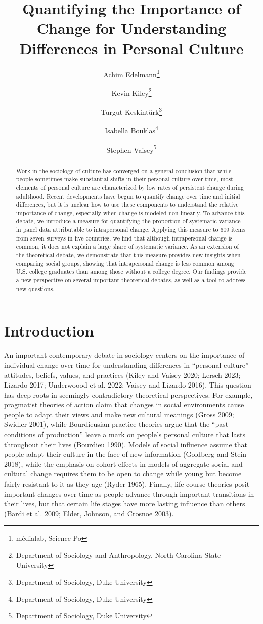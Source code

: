 \documentclass[
  12pt,
]{article}
\title{Quantifying the Importance of Change for Understanding
Differences in Personal Culture}
\author{Achim Edelmann\footnote{médialab, Science Po} \and Kevin
Kiley\footnote{Department of Sociology and Anthropology, North Carolina
  State University} \and Turgut Keskintürk\footnote{Department of
  Sociology, Duke University} \and Isabella
Bouklas\footnote{Department of Sociology, Duke University} \and Stephen
Vaisey\footnote{Department of Sociology, Duke University}}
\date{}
\begin{document}
\maketitle
\begin{abstract}
Work in the sociology of culture has converged on a general conclusion
that while people sometimes make substantial shifts in their personal
culture over time, most elements of personal culture are characterized
by low rates of persistent change during adulthood. Recent developments
have begun to quantify change over time and initial differences, but it
is unclear how to use these components to understand the relative
importance of change, especially when change is modeled non-linearly. To
advance this debate, we introduce a measure for quantifying the
proportion of systematic variance in panel data attributable to
intrapersonal change. Applying this measure to 609 items from seven
surveys in five countries, we find that although intrapersonal change is
common, it does not explain a large share of systematic variance. As an
extension of the theoretical debate, we demonstrate that this measure
provides new insights when comparing social groups, showing that
intrapersonal change is less common among U.S. college graduates than
among those without a college degree. Our findings provide a new
perspective on several important theoretical debates, as well as a tool
to address new questions.
\end{abstract}

\doublespacing

\hypertarget{introduction}{%
\section{Introduction}\label{introduction}}

An important contemporary debate in sociology centers on the importance
of individual change over time for understanding differences in
``personal culture''---attitudes, beliefs, values, and practices (Kiley
and Vaisey 2020; Lersch 2023; Lizardo 2017; Underwoood et al. 2022;
Vaisey and Lizardo 2016). This question has deep roots in seemingly
contradictory theoretical perspectives. For example, pragmatist theories
of action claim that changes in social environments cause people to
adapt their views and make new cultural meanings (Gross 2009; Swidler
2001), while Bourdieusian practice theories argue that the ``past
conditions of production'' leave a mark on people's personal culture
that lasts throughout their lives (Bourdieu 1990). Models of social
influence assume that people adapt their culture in the face of new
information (Goldberg and Stein 2018), while the emphasis on cohort
effects in models of aggregate social and cultural change requires them
to be open to change while young but become fairly resistant to it as
they age (Ryder 1965). Finally, life course theories posit important
changes over time as people advance through important transitions in
their lives, but that certain life stages have more lasting influence
than others (Bardi et al. 2009; Elder, Johnson, and Crosnoe 2003).
\end{document}

